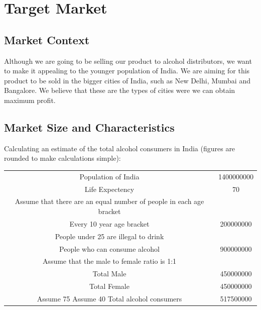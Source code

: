 \documentclass[11pt]{article}
\begin{document}
\newpage
\section{Target Market}
  \subsection{Market Context}
		Although we are going to be selling our product to alcohol distributors,
		we want to make it appealing to the younger population of India. We are aiming
		for this product to be sold in the bigger cities of India, such as New Delhi,
		Mumbai and Bangalore. We believe that these are the types of cities were we can
		obtain maximum profit.
  \subsection{Market Size and Characteristics}
		Calculating an estimate of the total alcohol consumers in India (figures are rounded to make calculations simple):
		\begin{center}
			\begin{tabular}{ | c | c | }
				Population of India & 1400000000 \\
				Life Expectency & 70 \\
				Assume that there are an equal number of people in each age bracket & \\
				Every 10 year age bracket & 200000000 \\
				People under 25 are illegal to drink & \\
				People who can consume alcohol & 900000000 \\
				Assume that the male to female ratio is 1:1 & \\
				Total Male & 450000000 \\
				Total Female & 450000000 \\
				Assume 75%
				Assume 40%
				Total alcohol consumers & 517500000 \\
			\end{tabular}
		\end{center}
\end{document}
